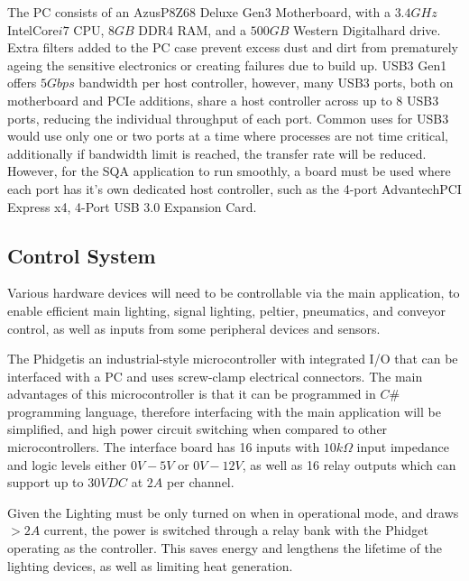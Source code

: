 \documentclass[fleqn,twoside,12pt]{report}
\begin{document}
The PC consists of an Azus\textregistered P8Z68 Deluxe Gen3 Motherboard, with a $3.4GHz$ Intel\textregistered Core\texttrademark $i7$ CPU, $8GB$ DDR4 RAM, and a $500GB$ Western Digital\textregistered hard drive. Extra filters added to the PC case prevent excess dust and dirt from prematurely ageing the sensitive electronics or creating failures due to build up. USB3 Gen1 offers $5Gbps$ bandwidth per host controller, however, many USB3 ports, both on motherboard and PCIe additions, share a host controller across up to 8 USB3 ports, reducing the individual throughput of each port. Common uses for USB3 would use only one or two ports at a time where processes are not time critical, additionally if bandwidth limit is reached, the transfer rate will be reduced. However, for the SQA application to run smoothly, a board must be used where each port has it's own dedicated host controller, such as the 4-port Advantech\texttrademark PCI Express x4, 4-Port USB 3.0 Expansion Card. 


\subsection{Control System}
\label{sec:phidget}

Various hardware devices will need to be controllable via the main application, to enable efficient main lighting, signal lighting, peltier, pneumatics, and conveyor control, as well as inputs from some peripheral devices and sensors.


The Phidget\texttrademark is an industrial-style microcontroller with integrated I/O that can be interfaced with a PC and uses screw-clamp electrical connectors. The main advantages of this microcontroller is that it can be programmed in $C\#$ programming language, therefore interfacing with the main application will be simplified, and high power circuit switching when compared to other microcontrollers. The interface board has 16 inputs with $10k\Omega$ input impedance and logic levels either $0V-5V$ or $0V-12V$, as well as 16 relay outputs which can support up to $30VDC$ at $2A$ per channel. 


Given the Lighting must be only turned on when in operational mode, and draws $>2A$ current, the power is switched through a relay bank with the Phidget operating as the controller. This saves energy and lengthens the lifetime of the lighting devices, as well as limiting heat generation.
\end{document}
